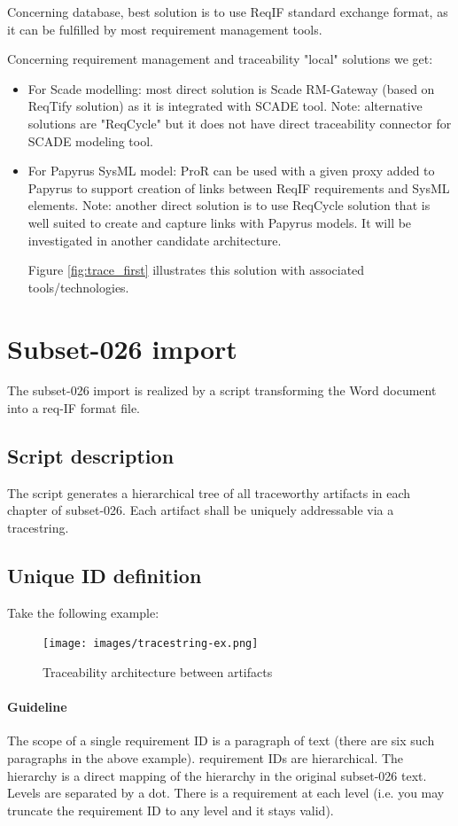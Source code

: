 \documentclass[11pt]{template/openetcs_report}
\begin{document}
Concerning database, best solution is to use ReqIF standard exchange format, as it can be fulfilled by most requirement management tools. 

Concerning requirement management and traceability "local" solutions we get: 
\begin{itemize}
\item For Scade modelling: most direct solution is Scade RM-Gateway (based on ReqTify solution) as it is integrated with SCADE tool.
Note: alternative solutions are "ReqCycle" but it does not have direct traceability connector for SCADE modeling tool.
\item For Papyrus SysML model: ProR can be used with a given proxy added to Papyrus to support creation of links between ReqIF requirements and SysML elements.
Note: another direct solution is to use ReqCycle solution that is well suited to create and capture links with Papyrus models. It will be investigated in another candidate architecture.

Figure \ref{fig:trace_first} illustrates this solution with associated tools/technologies.

\end{itemize}



\section{Subset-026 import}
\label{sec-5}
The subset-026 import is realized by a script transforming the Word document
into a req-IF format file.
\subsection{Script description}
\label{sec-2-1}
The script  generates a hierarchical tree of all traceworthy
artifacts in each chapter of subset-026. Each artifact shall be uniquely
addressable via a tracestring.


\subsection{Unique ID definition}
\label{sec-2-2}
Take the following example:
\begin{figure}[htb]
\centering
\texttt{[image: images/tracestring-ex.png]}
\caption{\label{fig:reqID_ex}Traceability architecture between artifacts}
\end{figure}


\paragraph{Guideline}
The scope of a single requirement ID is a paragraph of text (there are six such
paragraphs in the above example).  requirement IDs are hierarchical. The
hierarchy is a direct mapping of the hierarchy in the original subset-026
text. Levels are separated by a dot. There is a requirement at each level
(i.e. you may truncate the requirement ID to any level and it stays valid).
\end{document}
